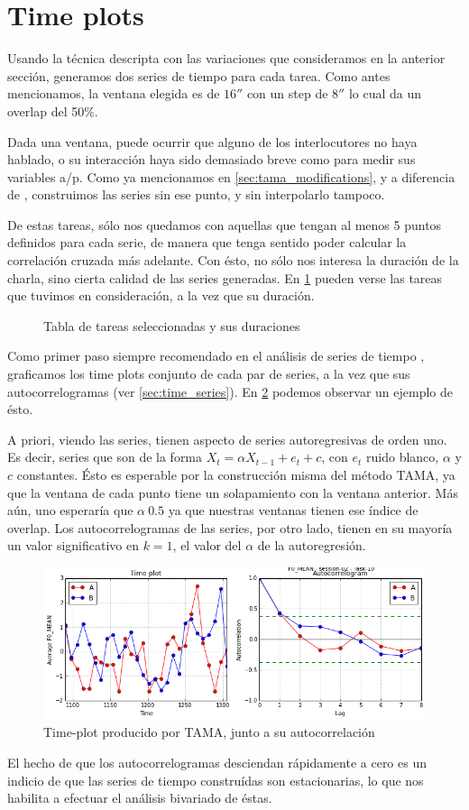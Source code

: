 \section{Time plots}

Usando la técnica descripta con las variaciones que consideramos en la anterior sección, generamos dos series de tiempo para cada tarea. Como antes mencionamos, la ventana elegida es de $16''$ con un step de $8''$ lo cual da un overlap del 50\%.

Dada una ventana, puede ocurrir que alguno de los interlocutores no haya hablado, o su interacción haya sido demasiado breve como para medir sus variables a/p. Como ya mencionamos en \ref{sec:tama_modifications}, y a diferencia de \cite{KOU2008.2}, construimos las series sin ese punto, y sin interpolarlo tampoco.

De estas tareas, sólo nos quedamos con aquellas que tengan al menos 5 puntos definidos para cada serie, de manera que tenga sentido poder calcular la correlación cruzada más adelante. Con ésto, no sólo nos interesa la duración de la charla, sino cierta calidad de las series generadas. En \ref{fig:time_series_table} pueden verse las tareas que tuvimos en consideración, a la vez que su duración.

\begin{figure}
\centering

\caption{Tabla de tareas seleccionadas y sus duraciones}
\label{fig:time_series_table}
\end{figure}


Como primer paso siempre recomendado en el análisis de series de tiempo \cite{CHATFIELD}, graficamos los time plots conjunto de cada par de series, a la vez que sus autocorrelogramas (ver \ref{sec:time_series}). En \ref{fig:time_plot} podemos observar un ejemplo de ésto.

A priori, viendo las series, tienen aspecto de series autoregresivas de orden uno. Es decir, series que son de la forma $X_t = \alpha X_{t-1} + e_t + c$, con $e_t$ ruido blanco, $\alpha$ y $c$ constantes. Ésto es esperable  por la construcción misma del método TAMA, ya que la ventana de cada punto tiene un solapamiento con la ventana anterior. Más aún, uno esperaría que $\alpha ~ 0.5$ ya que nuestras ventanas tienen ese índice de overlap. Los autocorrelogramas de las series, por otro lado, tienen en su mayoría un valor significativo en $k = 1$, el valor del $\alpha$ de la autoregresión.


\begin{figure}
\centering
\includegraphics[width=15cm]{images/time_plot_with_autocorrelation.png}
\caption{Time-plot producido por TAMA, junto a su autocorrelación}
\label{fig:time_plot}
\end{figure}

El hecho de que los autocorrelogramas desciendan rápidamente a cero es un indicio de que las series de tiempo construídas son estacionarias, lo que nos habilita a efectuar el análisis bivariado de éstas.
